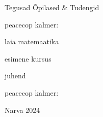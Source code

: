\begin{titlepage}
\par{Tegusad Õpilased \& Tudengid}
\vspace{0.3\textheight}
\par{peacecop kalmer:}
\LARGE
\par{laia matemaatika}
\par{esimene kursus}
\normalsize
\par{juhend}
\vspace{0.3\textheight}
\begin{flushright}
\par{peacecop kalmer:}
\end{flushright}
\vfill
Narva
\hfill
2024
\end{titlepage}

